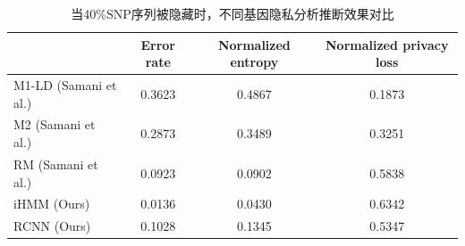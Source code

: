 \begin{table}[htbp]
	\caption{当40\%SNP序列被隐藏时，不同基因隐私分析推断效果对比}
	\label{tab:performance-40per}
	\begin{tabular}{lccc}
		\hline
		& Error rate & Normalized entropy & Normalized privacy loss \\
		\hline
		M1-LD (Samani et al.) & 0.3623 & 0.4867 & 0.1873 \\
		M2 (Samani et al.)    & 0.2873 & 0.3489 & 0.3251 \\
		RM (Samani et al.)    & 0.0923 & 0.0902 & 0.5838 \\
		iHMM (Ours)          & 0.0136 & 0.0430 & 0.6342 \\
		RCNN (Ours)          & 0.1028 & 0.1345 & 0.5347\\
		\hline
	\end{tabular}
\end{table}

